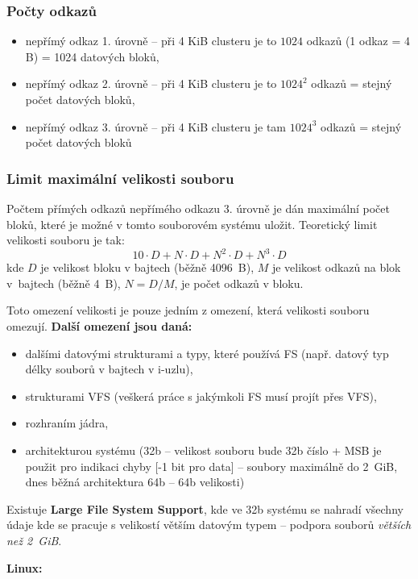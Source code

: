 \documentclass[a4paper, 11pt]{article}
\begin{document}
\newpage

\subsubsection{Počty odkazů}
\begin{itemize}
    \item nepřímý odkaz 1. úrovně -- při 4 KiB clusteru je to $1024$ odkazů (1 odkaz = 4 B) = 1024 datových bloků,
    \item nepřímý odkaz 2. úrovně -- při 4 KiB clusteru je to $1024^2$ odkazů = stejný počet datových bloků,
    \item nepřímý odkaz 3. úrovně -- při 4 KiB clusteru je tam $1024^3$ odkazů = stejný počet datových bloků
\end{itemize}

\subsubsection{Limit maximální velikosti souboru}

Počtem přímých odkazů nepřímého odkazu 3. úrovně je dán maximální počet bloků, které je možné v tomto souborovém systému uložit. Teoretický limit velikosti souboru je tak:
\[
10 \cdot D + N \cdot D + N^2 \cdot D + N^3 \cdot D
\]
kde $D$ je velikost bloku v bajtech (běžně 4096~B), $M$ je velikost odkazů na blok v~bajtech (běžně 4~B), $N = D/M$, je počet odkazů v bloku.
 
Toto omezení velikosti je pouze jedním z omezení, která velikosti souboru omezují.
\textbf{Další omezení jsou daná:}
\begin{itemize}
    \item dalšími datovými strukturami a typy, které používá FS (např. datový typ délky souborů v bajtech v i-uzlu),
    \item strukturami VFS (veškerá práce s jakýmkoli FS musí projít přes VFS),
    \item rozhraním jádra,
    \item architekturou systému (32b -- velikost souboru bude 32b číslo + MSB je použit pro indikaci chyby [-1 bit pro data] -- soubory maximálně do 2~GiB, dnes běžná architektura 64b -- 64b velikosti)
\end{itemize}
 
Existuje \textbf{Large File System Support}, kde ve 32b systému se nahradí všechny údaje kde se pracuje s velikostí větším datovým typem -- podpora souborů \textit{větších než 2~GiB}.
 
\textbf{Linux:}
\end{document}
